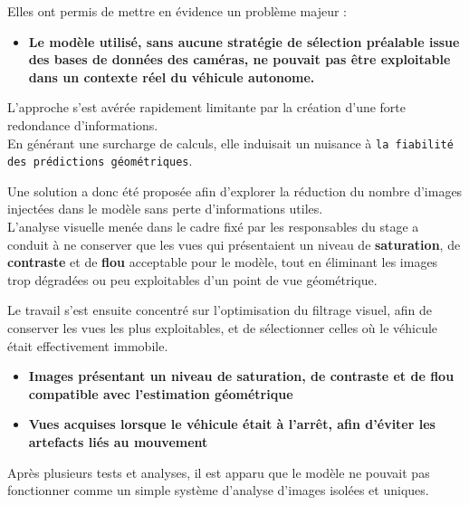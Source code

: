 \documentclass[12pt,a4paper,oneside]{report}
\begin{document}
Elles ont permis de mettre en évidence un problème majeur :
\begin{itemize}[label=\textbullet, leftmargin=2cm]
    \item \textbf{Le modèle utilisé, sans aucune stratégie de sélection préalable issue des bases de données des caméras, ne pouvait pas être exploitable dans un contexte réel du véhicule autonome.}
\end{itemize}

\bigskip

\hspace*{.5cm}L'approche s'est avérée rapidement limitante par la création d'une forte redondance d'informations.\\
\hspace*{0.5cm}En générant une surcharge de calculs, elle induisait un nuisance à \texttt{la fiabilité des prédictions géométriques}.\vspace{0.2cm}

\hspace*{.5cm} Une solution a donc été proposée afin d'explorer la réduction du nombre d'images injectées dans le modèle sans perte d'informations utiles.\\
\hspace*{.5cm} L'analyse visuelle menée dans le cadre fixé par les responsables du stage a conduit à ne conserver que les vues qui présentaient un niveau de \textbf{saturation}, de \textbf{contraste} et de \textbf{flou} acceptable pour le modèle, tout en éliminant les images trop dégradées ou peu exploitables d'un point de vue géométrique.\vspace{0.1cm}

\hspace*{.5cm} Le travail s'est ensuite concentré sur l'optimisation du filtrage visuel, afin de conserver les vues les plus exploitables, et de sélectionner celles où le véhicule était effectivement immobile. 
\begin{itemize}[label=\textbullet, leftmargin=2cm]
    \item \textbf{Images présentant un niveau de saturation, de contraste et de flou compatible avec l'estimation géométrique}
    \item \textbf{Vues acquises lorsque le véhicule était à l'arrêt, afin d'éviter les artefacts liés au mouvement}
\end{itemize}

Après plusieurs tests et analyses, il est apparu que le modèle ne pouvait pas fonctionner comme un simple système d'analyse d'images isolées et uniques.\\
\end{document}
